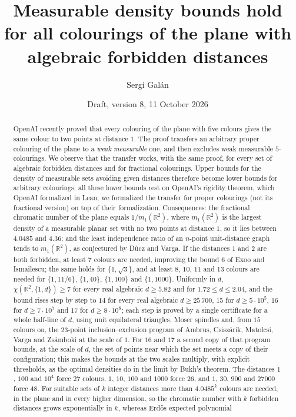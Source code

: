 \documentclass[11pt,a4paper]{amsart}
\title[Density bounds for all colourings of the plane]{Measurable density bounds hold for all colourings of the
plane with algebraic forbidden distances}
\author{Sergi Gal\'an}
\date{Draft, version 8, 11 October 2026}
\theoremstyle{definition}
\theoremstyle{remark}
\newcommand{\R}{\mathbb{R}}
\begin{document}
\begin{abstract}
OpenAI recently proved that every colouring of the plane with five colours gives the same colour to two points at
distance $1$. The proof transfers an arbitrary proper colouring of the plane to a \emph{weak measurable} one, and then
excludes weak measurable $5$-colourings. We observe that the transfer works, with the same proof, for every set of
algebraic forbidden distances and for fractional colourings. Upper bounds for the density of measurable sets avoiding
given distances therefore become lower bounds for arbitrary colourings; all these lower bounds rest on OpenAI's
rigidity theorem, which OpenAI formalized in Lean; we formalized the transfer for proper colourings (not its
fractional version) on top of their formalization. Consequences: the fractional chromatic number
of the plane equals $1/m_1(\R^2)$, where $m_1(\R^2)$ is the largest density of a measurable planar set with no two
points at distance $1$, so it lies between $4.0485$ and $4.36$; and the least independence ratio of an $n$-point
unit-distance graph tends to $m_1(\R^2)$, as conjectured by Dúcz and Varga. If the distances $1$ and $2$ are both
forbidden, at least $7$ colours are needed, improving the bound $6$ of Exoo and Ismailescu; the same holds for
$\{1,\sqrt3\}$, and at least $8$, $10$, $11$ and $13$ colours are needed for $\{1,11/6\}$, $\{1,40\}$,
$\{1,100\}$ and $\{1,1000\}$. Uniformly in $d$, $\chi(\R^2,\{1,d\})\ge7$ for every real algebraic $d\ge5.82$ and for
$1.72\le d\le2.04$, and the bound rises step by step to $14$ for every real algebraic $d\ge25\,700$, $15$ for
$d\ge5\cdot10^5$, $16$ for $d\ge7\cdot10^7$ and $17$ for $d\ge8\cdot10^8$; each step is proved by a single certificate for a
whole half-line of $d$, using unit equilateral triangles, Moser spindles and, from $15$ colours on, the $23$-point
inclusion--exclusion program of Ambrus, Csiszárik, Matolcsi, Varga and Zsámboki at the scale of $1$. For $16$ and
$17$ a second copy of that program bounds, at the scale of $d$, the set of points near which the set meets a copy of
their configuration; this makes the bounds at the two scales multiply, with explicit thresholds, as the optimal
densities do in the limit by Bukh's theorem. The
distances $1$, $100$ and $10^4$ force $27$ colours, $1$, $10$, $100$ and $1000$ force $26$, and $1$, $30$, $900$ and
$27000$ force $48$. For
suitable sets of $k$ integer distances more than $4.0485^k$ colours are needed, in the plane and in every higher
dimension, so the
chromatic number with $k$ forbidden distances grows exponentially in $k$, whereas Erd\H{o}s expected polynomial

\end{abstract}
\end{document}
